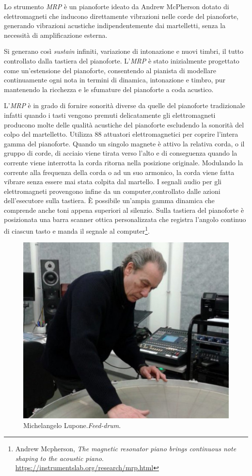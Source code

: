Lo strumento \emph{MRP} è un pianoforte ideato da Andrew McPherson dotato di
elettromagneti  che inducono direttamente vibrazioni nelle corde del pianoforte, generando vibrazioni acustiche indipendentemente dai martelletti, senza la
necessità di amplificazione esterna.

Si generano così \emph{sustain} infiniti, variazione di intonazione e nuovi
timbri, il tutto controllato dalla tastiera del pianoforte. L'\emph{MRP} è
stato inizialmente progettato come un'estensione del pianoforte, consentendo
al pianista di modellare continuamente ogni nota in termini di dinamica,
intonazione e timbro, pur mantenendo la ricchezza e le sfumature del pianoforte
a coda acustico.

L'\emph{MRP} è in grado di fornire sonorità diverse da quelle del pianoforte
tradizionale infatti quando i tasti vengono premuti delicatamente gli
elettromagneti producono molte delle qualità acustiche del pianoforte
escludendo la sonorità del colpo del martelletto. Utilizza 88 attuatori elettromagnetici per coprire l'intera gamma del pianoforte. Quando un singolo
magnete è attivo la relativa corda, o il gruppo di corde, di acciaio viene
tirata verso l’alto e di conseguenza quando la corrente viene interrotta la
corda ritorna nella posizione originale. Modulando la corrente alla frequenza
della corda o ad un suo armonico, la corda viene fatta vibrare senza essere mai
stata colpita dal martello. I segnali audio per gli elettromagneti provengono
infine da un computer,controllato dalle azioni dell’esecutore sulla tastiera.
È possibile un'ampia gamma dinamica che comprende anche toni appena superiori
al silenzio. Sulla tastiera del pianoforte è posizionata una barra scanner
ottica personalizzata che registra l'angolo continuo di ciascun tasto e manda
il segnale al computer\footnote{Andrew Mcpherson, \emph{The magnetic resonator
piano brings continuous note shaping to the acoustic piano}.
\url{https://instrumentslab.org/research/mrp.html}}.

\begin{figure}%
\centering
\includegraphics[width=0.99\columnwidth]{Graphics/foto/michelangelo_lupone_recadre}
\caption[]{Michelangelo Lupone.\emph{Feed-drum}.}
\label{mrp}
\end{figure}

